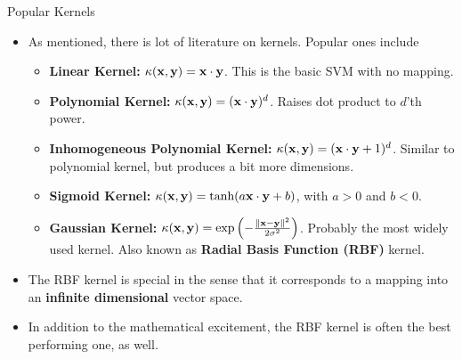\documentclass[10pt, aspectratio=169]{beamer} %
\newcommand{\x}{{\bf x}}
\newcommand{\y}{{\bf y}}
\begin{document}
\begin{frame}[fragile,allowframebreaks=0.8]
 {Popular Kernels}
\begin{itemize}
\item As mentioned, there is lot of literature on kernels. Popular ones include
\begin{itemize}
\item \textbf{Linear Kernel:} $\kappa(\x, \y) = \x \cdot \y$. This is the basic SVM with no mapping.
\item \textbf{Polynomial Kernel:} $\kappa(\x, \y) = (\x \cdot \y)^d$. Raises dot product to $d$'th power.
\item \textbf{Inhomogeneous Polynomial Kernel:} $\kappa(\x, \y) = (\x \cdot \y + 1)^d$. Similar to polynomial kernel, but produces a bit more dimensions.
\item \textbf{Sigmoid Kernel:} $\kappa(\x, \y) = \mathop{\text{tanh}}(a\x\cdot \y + b)$, with $a>0$ and $b < 0$.
\item \textbf{Gaussian Kernel:} $\kappa(\x, \y) = \exp\left(-\frac{\|\x - \y\|^2}{2\sigma^2} \right)$. Probably the most widely used kernel.
Also known as \textbf{Radial Basis Function (RBF)} kernel.
\end{itemize}
\item The RBF kernel is special in the sense that it corresponds to a mapping into an
\textbf{infinite dimensional} vector space.
\item In addition to the mathematical excitement, the RBF kernel is often the best performing one, as well.
\end{itemize}
\end{frame}
\end{document}
